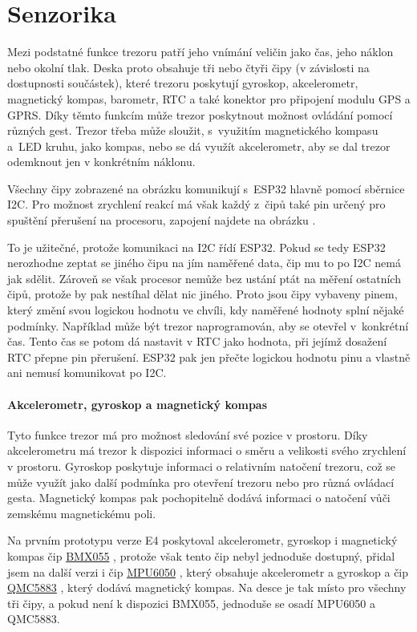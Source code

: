 \section{Senzorika}
Mezi podstatné funkce trezoru patří jeho vnímání veličin jako čas, jeho náklon nebo okolní tlak.
Deska proto obsahuje tři nebo čtyři čipy (v závislosti na dostupnosti součástek), které trezoru poskytují gyroskop, akcelerometr, magnetický kompas,
barometr, RTC a také konektor pro připojení modulu GPS a GPRS. Díky těmto funkcím může trezor poskytnout možnost ovládání 
pomocí různých gest. 
Trezor třeba může sloužit, s~využitím magnetického kompasu a~LED kruhu, jako kompas, nebo se dá využít akcelerometr, 
aby se dal trezor odemknout jen v konkrétním náklonu. 

Všechny čipy zobrazené na obrázku  komunikují s~ESP32 hlavně pomocí 
sběrnice I2C. Pro možnost zrychlení reakcí má však každý z~čipů také pin určený pro spuštění přerušení na procesoru, zapojení najdete na obrázku . 

To je užitečné, protože komunikaci na I2C řídí ESP32. Pokud se tedy ESP32 nerozhodne zeptat se jiného čipu na jím naměřené data, čip mu to po I2C nemá 
jak sdělit. Zároveň se však procesor nemůže bez ustání ptát na měření ostatních čipů, protože by pak nestíhal dělat nic jiného. Proto jsou čipy vybaveny 
pinem, který změní svou logickou hodnotu ve chvíli, kdy naměřené hodnoty splní nějaké podmínky. 
Například může být trezor naprogramován, aby se otevřel 
v~konkrétní čas. Tento čas se potom dá nastavit v RTC jako hodnota, při jejímž dosažení RTC přepne pin přerušení. ESP32 pak jen přečte logickou hodnotu 
pinu a vlastně ani nemusí komunikovat po I2C.

\paragraph{Akcelerometr, gyroskop a magnetický kompas}
Tyto funkce trezor má pro možnost sledování své pozice v prostoru. 
Díky akcelerometru má trezor k dispozici informaci o směru a velikosti svého zrychlení v prostoru.
Gyroskop poskytuje informaci o relativním natočení trezoru, což se může využít jako další podmínka pro otevření trezoru nebo pro různá ovládací gesta.
Magnetický kompas pak pochopitelně dodává informaci o natočení vůči zemskému magnetickému poli.

Na prvním prototypu verze E4 poskytoval akcelerometr, gyroskop i magnetický kompas čip \href{https://datasheet.lcsc.com/szlcsc/Bosch-Sensortec-BMX055_C94022.pdf}{BMX055} \parencite{bmx055},
protože však tento čip nebyl jednoduše dostupný, přidal jsem na další verzi i čip \href{https://datasheet.lcsc.com/szlcsc/TDK-InvenSense-MPU-6050_C24112.pdf}{MPU6050} \parencite{mpu6050},
který obsahuje akcelerometr a gyroskop a čip \href{https://datasheet.lcsc.com/szlcsc/QST-QMC5883L-TR_C192585.pdf}{QMC5883} \parencite{qmc5883}, který dodává magnetický kompas.
Na desce je tak místo pro všechny tři čipy, a pokud není k dispozici BMX055, jednoduše se osadí MPU6050 a QMC5883. 

